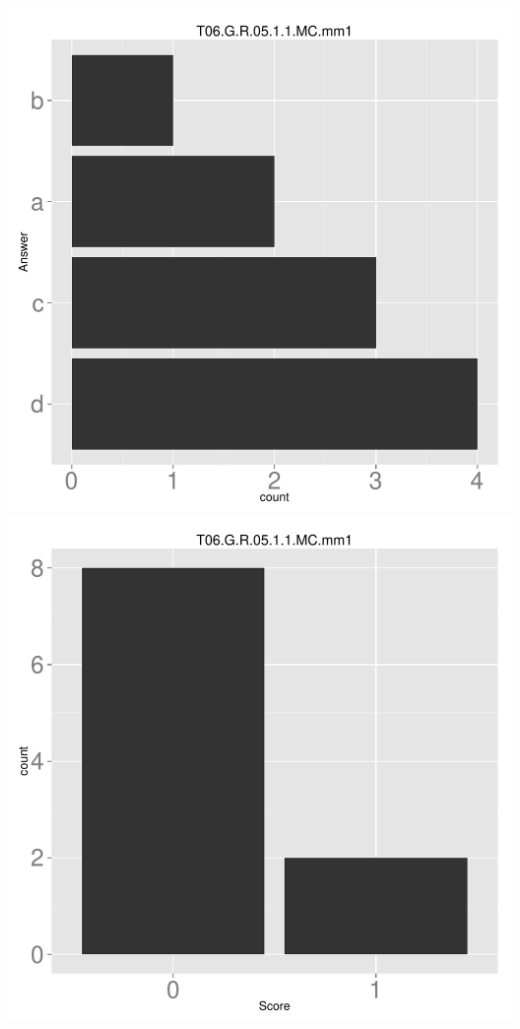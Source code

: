 \documentclass[12pt,english,nohyper]{tufte-handout}\usepackage[]{graphicx}\usepackage[]{color}
\begin{document}
\begin{center} \includegraphics[width=.45\linewidth]{Topic06_AB_70_answer} \includegraphics[width=.45\linewidth]{Topic06_AB_70_score} \end{center} 
\end{document}
